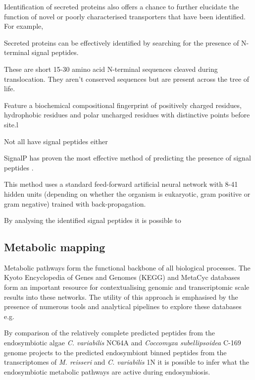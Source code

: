 Identification of secreted proteins also offers
a chance to further elucidate the function of novel or poorly 
characterised transporters that have been identified. 
For example, 

Secreted proteins can be effectively identified by 
searching for the presence of N-terminal signal peptides. 

These are short 15-30 amino acid N-terminal sequences cleaved during translocation.
They aren't conserved sequences but are present across the tree of life.

Feature a biochemical compositional fingerprint 
of positively charged residues, hydrophobic residues and polar uncharged
residues with distinctive points before site.l \citep{Emanuelsson2007}





Not all have signal peptides either





SignalP \citep{Nielsen1997} has proven the most effective method of predicting
the presence of signal peptides \citep{Lee2009a,Petersen2011}.


This method uses a standard feed-forward artificial neural network
with 8-41 hidden units (depending on whether the organism is eukaryotic, 
gram positive or gram negative) trained with back-propagation.




By analysing the identified signal peptides it is possible
to 

\subsection{Metabolic mapping}

Metabolic pathways form the functional backbone of all biological processes. 
The Kyoto Encyclopedia of Genes and Genomes (KEGG) \citep{Ogata1999,Okuda2008,Kanehisa2014} 
and MetaCyc \citep{Caspi2007} databases form an important resource for contextualising
genomic and transcriptomic scale results into these networks. 
The utility of this approach is emphasised by the presence of numerous
tools and analytical pipelines to explore these databases 
e.g. \citep{Okuda2008,Nakao1999,Karp2002,Karp2010,Antonov2008,Klukas2007}

By comparison of the relatively complete predicted peptides from 
the endosymbiotic algae \textit{C. variabilis} NC64A and \textit{Coccomyxa
subellipsoidea} C-169 genome projects to the predicted endosymbiont binned peptides
from the transcriptomes of \textit{M. reisseri} and \textit{C. variabilis} 1N
it is possible to infer what the endosymbiotic metabolic pathways
are active during endosymbiosis. 














